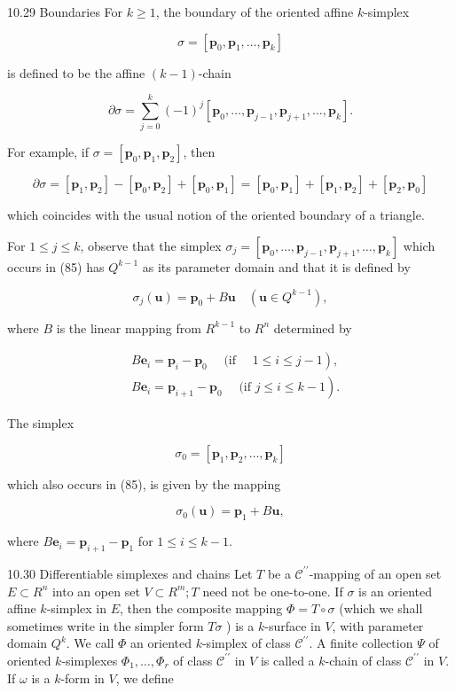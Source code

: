 \documentclass[10pt]{article}
\begin{document}
10.29 Boundaries For $k \geq 1$, the boundary of the oriented affine $k$-simplex

$$
\sigma=\left[\mathbf{p}_{0}, \mathbf{p}_{1}, \ldots, \mathbf{p}_{k}\right]
$$

is defined to be the affine $(k-1)$-chain

$$
\partial \sigma=\sum_{j=0}^{k}(-1)^{j}\left[\mathbf{p}_{0}, \ldots, \mathbf{p}_{j-1}, \mathbf{p}_{j+1}, \ldots, \mathbf{p}_{k}\right] .
$$

For example, if $\sigma=\left[\mathbf{p}_{0}, \mathbf{p}_{1}, \mathbf{p}_{2}\right]$, then

$$
\partial \sigma=\left[\mathbf{p}_{1}, \mathbf{p}_{2}\right]-\left[\mathbf{p}_{0}, \mathbf{p}_{2}\right]+\left[\mathbf{p}_{0}, \mathbf{p}_{1}\right]=\left[\mathbf{p}_{0}, \mathbf{p}_{1}\right]+\left[\mathbf{p}_{1}, \mathbf{p}_{2}\right]+\left[\mathbf{p}_{2}, \mathbf{p}_{0}\right]
$$

which coincides with the usual notion of the oriented boundary of a triangle.

For $1 \leq j \leq k$, observe that the simplex $\sigma_{j}=\left[\mathbf{p}_{0}, \ldots, \mathbf{p}_{j-1}, \mathbf{p}_{j+1}, \ldots, \mathbf{p}_{k}\right]$ which occurs in (85) has $Q^{k-1}$ as its parameter domain and that it is defined by

$$
\sigma_{j}(\mathbf{u})=\mathbf{p}_{0}+B \mathbf{u} \quad\left(\mathbf{u} \in Q^{k-1}\right),
$$

where $B$ is the linear mapping from $R^{k-1}$ to $R^{n}$ determined by

$$
\begin{aligned}
& \left.B \mathbf{e}_{i}=\mathbf{p}_{i}-\mathbf{p}_{0} \quad \text { (if } \quad 1 \leq i \leq j-1\right), \\
& \left.B \mathbf{e}_{i}=\mathbf{p}_{i+1}-\mathbf{p}_{0} \quad \text { (if } j \leq i \leq k-1\right) .
\end{aligned}
$$

The simplex

$$
\sigma_{0}=\left[\mathbf{p}_{1}, \mathbf{p}_{2}, \ldots, \mathbf{p}_{k}\right]
$$

which also occurs in (85), is given by the mapping

$$
\sigma_{0}(\mathbf{u})=\mathbf{p}_{1}+B \mathbf{u},
$$

where $B \mathbf{e}_{i}=\mathbf{p}_{i+1}-\mathbf{p}_{1}$ for $1 \leq i \leq k-1$.

10.30 Differentiable simplexes and chains Let $T$ be a $\mathscr{C}^{\prime \prime}$-mapping of an open set $E \subset R^{n}$ into an open set $V \subset R^{m} ; T$ need not be one-to-one. If $\sigma$ is an oriented affine $k$-simplex in $E$, then the composite mapping $\Phi=T \circ \sigma$ (which we shall sometimes write in the simpler form $T \sigma$ ) is a $k$-surface in $V$, with parameter domain $Q^{k}$. We call $\Phi$ an oriented $k$-simplex of class $\mathscr{C}^{\prime \prime}$. A finite collection $\Psi$ of oriented $k$-simplexes $\Phi_{1}, \ldots, \Phi_{r}$ of class $\mathscr{C}^{\prime \prime}$ in $V$ is called a $k$-chain of class $\mathscr{C}^{\prime \prime}$ in $V$. If $\omega$ is a $k$-form in $V$, we define
\end{document}
